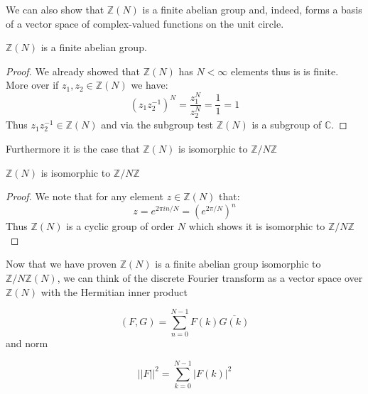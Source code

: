 \documentclass[../article.tex]{subfiles}
\begin{document}
We can also show that $\mathbb{Z}(N)$ is a finite abelian group and, indeed, forms a basis of a vector space of complex-valued functions on the unit circle.

\begin{theorem}
$\mathbb{Z}(N)$ is a finite abelian group.
\end{theorem}

\begin{proof}
    We already showed that $\mathbb{Z}(N)$ has $N < \infty$
    elements thus is is finite. More over if $z_1,z_2 \in
    \mathbb{Z}(N)$ we have:
    \[
        (z_1z_2^{-1})^N = \frac{z_1^N}{z_2^N} = \frac{1}{1} = 1
    \]
    Thus $z_1z_2^{-1} \in \mathbb{Z}(N)$ and via the subgroup
    test $\mathbb{Z}(N)$ is a subgroup of $\mathbb{C}$.
\end{proof}

Furthermore it is the case that $\mathbb{Z}(N)$ is isomorphic
to $\mathbb{Z}/N\mathbb{Z}$

\begin{theorem}
$\mathbb{Z}(N)$ is isomorphic to $\mathbb{Z}/N\mathbb{Z}$
\end{theorem}

\begin{proof}
    We note that for any element $z \in \mathbb{Z}(N)$
    that:
    \[
        z = e^{2\pi in/N} = (e^{2\pi/N})^n
    \]
    Thus $\mathbb{Z}(N)$ is a cyclic group of order $N$ 
    which shows it is isomorphic to $\mathbb{Z}/N\mathbb{Z}$
\end{proof}
Now that we have proven $\mathbb{Z}(N)$ is a finite abelian group  isomorphic to $\mathbb{Z} /N\mathbb{Z}(N)$, we can think of the discrete Fourier transform as a vector space over $\mathbb{Z}(N)$ with the Hermitian inner product


\[
  (F,G) = \sum_{n=0}^{N-1} F(k) \overline{G(k)}
\]
and norm

\[
  ||F||^2 = \sum_{k=0}^{N-1} |F(k)|^2
\]
\end{document}
